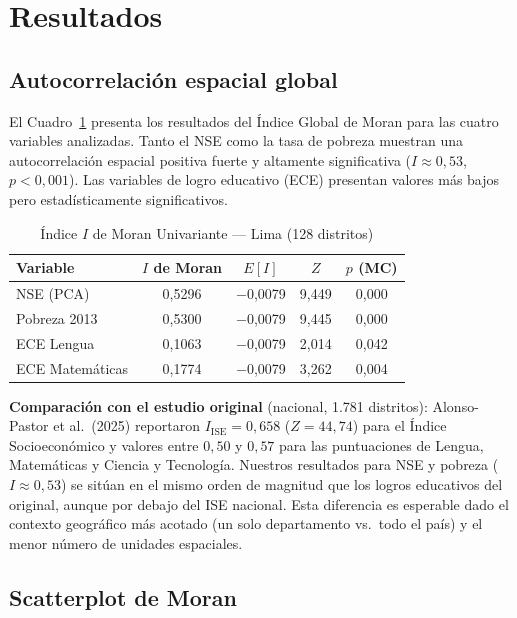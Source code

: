 \documentclass[12pt,a4paper]{article}
\begin{document}
\section{Resultados}

\subsection{Autocorrelación espacial global}

El Cuadro~\ref{tab:moran} presenta los resultados del Índice Global de Moran para las cuatro variables analizadas. Tanto el NSE como la tasa de pobreza muestran una autocorrelación espacial positiva fuerte y altamente significativa ($I \approx 0{,}53$, $p < 0{,}001$). Las variables de logro educativo (ECE) presentan valores más bajos pero estadísticamente significativos.

\begin{table}[H]
\centering
\caption{Índice $I$ de Moran Univariante — Lima (128 distritos)}
\label{tab:moran}
\begin{tabular}{lcccc}
\toprule
\textbf{Variable} & \textbf{$I$ de Moran} & \textbf{$E[I]$} & \textbf{$Z$} & \textbf{$p$ (MC)} \\
\midrule
NSE (PCA)         & 0{,}5296 & $-$0{,}0079 & 9{,}449 & 0{,}000 \\
Pobreza 2013      & 0{,}5300 & $-$0{,}0079 & 9{,}445 & 0{,}000 \\
ECE Lengua        & 0{,}1063 & $-$0{,}0079 & 2{,}014 & 0{,}042 \\
ECE Matemáticas   & 0{,}1774 & $-$0{,}0079 & 3{,}262 & 0{,}004 \\
\bottomrule
\end{tabular}
\end{table}

\noindent\textbf{Comparación con el estudio original} (nacional, 1.781 distritos): Alonso-Pastor et al.\ (2025) reportaron $I_{\text{ISE}} = 0{,}658$ ($Z = 44{,}74$) para el Índice Socioeconómico y valores entre $0{,}50$ y $0{,}57$ para las puntuaciones de Lengua, Matemáticas y Ciencia y Tecnología. Nuestros resultados para NSE y pobreza ($I \approx 0{,}53$) se sitúan en el mismo orden de magnitud que los logros educativos del original, aunque por debajo del ISE nacional. Esta diferencia es esperable dado el contexto geográfico más acotado (un solo departamento vs.\ todo el país) y el menor número de unidades espaciales.

\subsection{Scatterplot de Moran}
\end{document}
